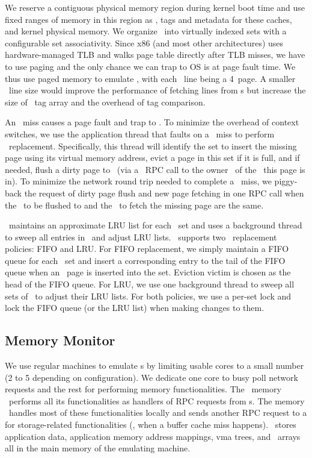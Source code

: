 \documentclass[10pt,times,twocolumn]{z2-article}
\begin{document}
{{{{{{{We reserve a contiguous physical memory region during kernel boot time
and use fixed ranges of memory in this region as \excache, tags and metadata for these caches, and kernel physical memory. 
We organize \excache\ into virtually indexed sets with a configurable set associativity.
Since x86 (and most other architectures) uses hardware-managed TLB and walks page table directly after TLB misses, 
we have to use paging and the only chance we can trap to OS is at page fault time. 
We thus use paged memory to emulate \excache, 
with each \excache\ line being a 4\KB\ page.
A smaller \excache\ line size would improve the performance of fetching lines from \mcomponent{}s
but increase the size of \excache\ tag array and the overhead of tag comparison. 

An \excache\ miss causes a page fault and trap to \lego.
To minimize the overhead of context switches,
we use the application thread that faults on a \excache\ miss
to perform \excache\ replacement.
Specifically, this thread will identify the set to insert the missing page
using its virtual memory address,
evict a page in this set if it is full,
and if needed, flush a dirty page to \mcomponent\ 
(via a \lego\ RPC call to the owner \mcomponent\ of the \vregion\ this page is in).
To minimize the network round trip needed to complete a \excache\ miss,
we piggy-back the request of dirty page flush and new page fetching
in one RPC call when the \mcomponent\ to be flushed to and the \mcomponent\ to fetch the missing page are the same.

\lego\ maintains an approximate LRU list for each \excache\ set 
and uses a background thread to sweep all entries in \excache\ and adjust LRU lists.
\lego\ supports two \excache\ replacement policies:
FIFO and LRU. For FIFO replacement, we simply maintain a FIFO queue for each \excache\ set and insert a
corresponding entry to the tail of the FIFO queue when
an \excache\ page is inserted into the set. Eviction victim is chosen as the head of the FIFO queue. 
For LRU, we use one background thread to sweep all sets of \excache\ to adjust their LRU lists.
For both policies, we use a per-set lock and lock the FIFO queue (or the LRU list) when
making changes to them.

\subsection{Memory Monitor}
\label{sec:memimpl}

We use regular machines to emulate \mcomponent{}s 
by limiting usable cores to a small number (2 to 5 depending on configuration).
We dedicate one core to busy poll network requests 
and the rest for performing memory functionalities. 
The \lego\ memory \microos\ performs all its functionalities as handlers of RPC requests from \pcomponent{}s.
The memory \microos\ handles most of these functionalities locally
and sends another RPC request to a \scomponent{} for storage-related functionalities (\eg, when a buffer cache miss happens).
\lego\ stores application data, application memory address mappings, vma trees, and \vregion\ arrays
all in the main memory of the emulating machine. 

}}}}}}}
\end{document}
